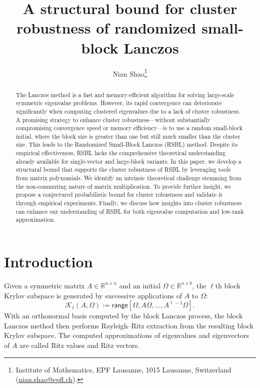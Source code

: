 \documentclass{article}
\newcommand{\defi}{:=}
\newcommand{\R}{\mathbb{R}}
\newcommand{\range}{\mathsf{range}}
\begin{document}
\title{A structural bound for cluster robustness of randomized small-block Lanczos}
\author{
    Nian Shao\thanks{
        Institute of Mathematics, EPF Lausanne, 1015 Lausanne, Switzerland
        (\href{mailto:nian.shao@epfl.ch}{nian.shao@epfl.ch}).
    }
}

\maketitle

\begin{abstract}
    The Lanczos method is a fast and memory-efficient algorithm for solving large-scale symmetric eigenvalue problems. However, its rapid convergence can deteriorate significantly when computing clustered eigenvalues due to a lack of cluster robustness. A promising strategy to enhance cluster robustness---without substantially compromising convergence speed or memory efficiency---is to use a random small-block initial, where the block size is greater than one but still much smaller than the cluster size. This leads to the Randomized Small-Block Lanczos (RSBL) method. Despite its empirical effectiveness, RSBL lacks the comprehensive theoretical understanding already available for single-vector and large-block variants. In this paper, we develop a structural bound that supports the cluster robustness of RSBL by leveraging tools from matrix polynomials. We identify an intrinsic theoretical challenge stemming from the non-commuting nature of matrix multiplication. To provide further insight, we propose a conjectured probabilistic bound for cluster robustness and validate it through empirical experiments. Finally, we discuss how insights into cluster robustness can enhance our understanding of RSBL for both eigenvalue computation and low-rank approximation.
\end{abstract}
\section{Introduction}
Given a symmetric matrix $A\in \R^{n\times n}$ and an initial $\Omega\in\R^{n\times b}$, the $\ell$th block Krylov subspace is generated by successive applications of $A$ to $\Omega$:
\begin{equation*}
    \mathcal{K}_{\ell}(A,\Omega) \defi \range[\Omega,A\Omega,\dotsc,A^{\ell-1}\Omega].
\end{equation*}
With an orthonormal basis computed by the block Lanczos process, the block Lanczos method then performs Rayleigh--Ritz extraction
from the resulting block Krylov subspace.
The computed approximations of eigenvalues and eigenvectors of $A$ are called Ritz values and Ritz vectors.
\end{document}
